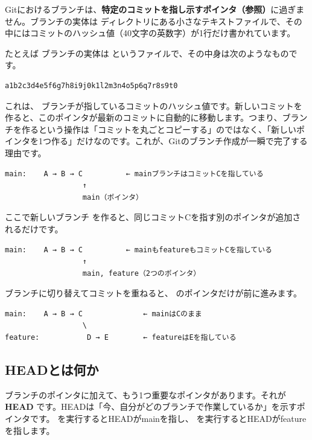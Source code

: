 Gitにおけるブランチは、\textbf{特定のコミットを指し示すポインタ（参照）}に過ぎません。ブランチの実体は  ディレクトリにある小さなテキストファイルで、その中にはコミットのハッシュ値（40文字の英数字）が1行だけ書かれています。

たとえば  ブランチの実体は  というファイルで、その中身は次のようなものです。

\begin{lstlisting}[language={}]
a1b2c3d4e5f6g7h8i9j0k1l2m3n4o5p6q7r8s9t0
\end{lstlisting}

これは、 ブランチが指しているコミットのハッシュ値です。新しいコミットを作ると、このポインタが最新のコミットに自動的に移動します。つまり、ブランチを作るという操作は「コミットを丸ごとコピーする」のではなく、「新しいポインタを1つ作る」だけなのです。これが、Gitのブランチ作成が一瞬で完了する理由です。

\begin{lstlisting}[language={}]
main:    A → B → C          ← mainブランチはコミットCを指している
                  ↑
                  main（ポインタ）
\end{lstlisting}

ここで新しいブランチ  を作ると、同じコミットCを指す別のポインタが追加されるだけです。

\begin{lstlisting}[language={}]
main:    A → B → C          ← mainもfeatureもコミットCを指している
                  ↑
                  main, feature（2つのポインタ）
\end{lstlisting}

 ブランチに切り替えてコミットを重ねると、 のポインタだけが前に進みます。

\begin{lstlisting}[language={}]
main:    A → B → C              ← mainはCのまま
                  \
feature:           D → E        ← featureはEを指している
\end{lstlisting}

\subsection{HEADとは何か}

ブランチのポインタに加えて、もう1つ重要なポインタがあります。それが \textbf{HEAD} です。HEADは「今、自分がどのブランチで作業しているか」を示すポインタです。 を実行するとHEADがmainを指し、 を実行するとHEADがfeatureを指します。

